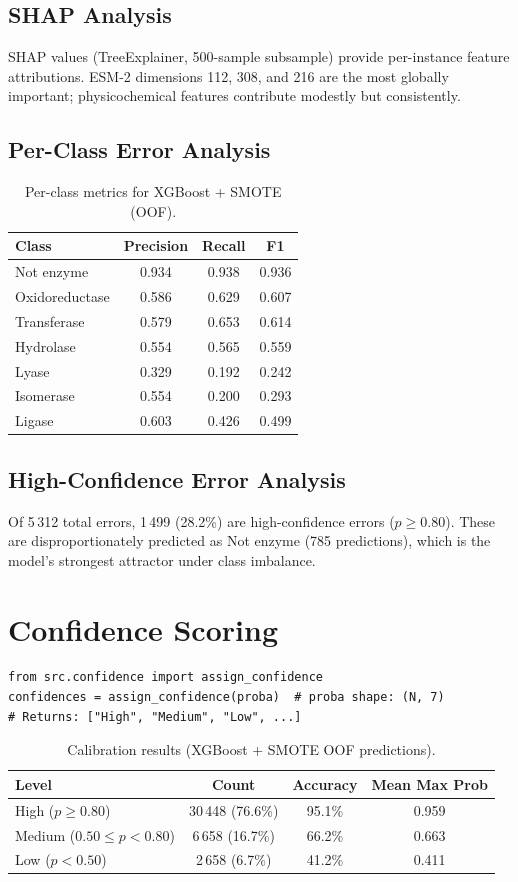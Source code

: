 \documentclass[11pt,a4paper]{article}
\begin{document}
\subsection{SHAP Analysis}
SHAP values (TreeExplainer, 500-sample subsample) provide per-instance feature attributions.
ESM-2 dimensions 112, 308, and 216 are the most globally important;
physicochemical features contribute modestly but consistently.

\subsection{Per-Class Error Analysis}
\begin{table}[H]
\centering
\caption{Per-class metrics for XGBoost + SMOTE (OOF).}
\begin{tabular}{lccc}
\toprule
Class & Precision & Recall & F1 \\
\midrule
Not enzyme & 0.934 & 0.938 & 0.936 \\
Oxidoreductase & 0.586 & 0.629 & 0.607 \\
Transferase & 0.579 & 0.653 & 0.614 \\
Hydrolase & 0.554 & 0.565 & 0.559 \\
Lyase & 0.329 & 0.192 & 0.242 \\
Isomerase & 0.554 & 0.200 & 0.293 \\
Ligase & 0.603 & 0.426 & 0.499 \\
\bottomrule
\end{tabular}
\end{table}

\subsection{High-Confidence Error Analysis}
Of 5\,312 total errors, 1\,499 (28.2\%) are high-confidence errors ($p \ge 0.80$).
These are disproportionately predicted as Not enzyme (785 predictions), which is
the model's strongest attractor under class imbalance.

\section{Confidence Scoring}
\begin{verbatim}
from src.confidence import assign_confidence
confidences = assign_confidence(proba)  # proba shape: (N, 7)
# Returns: ["High", "Medium", "Low", ...]
\end{verbatim}

\begin{table}[H]
\centering
\caption{Calibration results (XGBoost + SMOTE OOF predictions).}
\begin{tabular}{lccc}
\toprule
Level & Count & Accuracy & Mean Max Prob \\
\midrule
High ($p \ge 0.80$) & 30\,448 (76.6\%) & 95.1\% & 0.959 \\
Medium ($0.50 \le p < 0.80$) & 6\,658 (16.7\%) & 66.2\% & 0.663 \\
Low ($p < 0.50$) & 2\,658 (6.7\%) & 41.2\% & 0.411 \\
\bottomrule
\end{tabular}
\end{table}
\end{document}

